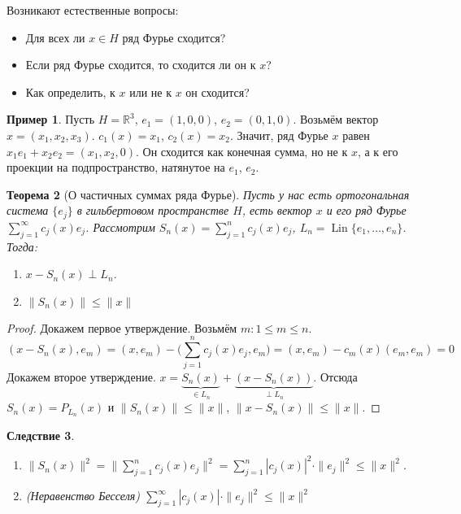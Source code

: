 \documentclass[11pt,openany,a4paper]{scrartcl}
\theoremstyle{plain}
\newtheorem{theorem}{Теорема}[subsection]
\newtheorem{corollary}[theorem]{Следствие}
\theoremstyle{definition}
\newtheorem{example}[theorem]{Пример}
\newcommand\mb{\mathbb}
\newcommand\real{\mb R}
\DeclareMathOperator{\Lin}{Lin}
\begin{document}
Возникают естественные вопросы:
\begin{itemize}
    \item Для всех ли $x \in H$ ряд Фурье сходится?
    \item Если ряд Фурье сходится, то сходится ли он к $x$?
    \item Как определить, к $x$ или не к $x$ он сходится?
\end{itemize}

\begin{example}\label{fourier_series_bad_example}
    Пусть $H = \real^3$, $e_1 = (1, 0, 0)$, $e_2 = (0, 1, 0)$. Возьмём вектор
$x = (x_1, x_2, x_3)$. $c_1(x) = x_1$, $c_2(x) = x_2$. Значит, ряд Фурье $x$ равен
$x_1e_1 + x_2e_2 = (x_1, x_2, 0)$. Он сходится как конечная сумма, но не к $x$, а
к его проекции на подпространство, натянутое на $e_1$, $e_2$.
\end{example}

\begin{theorem}[О частичных суммах ряда Фурье]
    Пусть у нас есть ортогональная система $\{e_j\}$ в гильбертовом пространстве
    $H$, есть вектор $x$ и его ряд Фурье $\sum\limits_{j=1}^\infty c_j(x)e_j$.
    Рассмотрим $S_n(x) = \sum\limits_{j=1}^n c_j(x)e_j$,
    $L_n = \Lin \{e_1,\ldots,e_n\}$. Тогда:
    \begin{enumerate}
        \item $x - S_n(x) \perp L_n$.
        \item $\|S_n(x)\| \leqslant \|x\|$
    \end{enumerate}
\end{theorem}
\begin{proof}
    Докажем первое утверждение. Возьмём $m: 1 \leqslant m \leqslant n$.
    $$
    (x - S_n(x), e_m) = (x, e_m) - \bigg(\sum\limits_{j=1}^n c_j(x)e_j, e_m\bigg) =
    (x, e_m) - c_m(x)(e_m, e_m) = 0
    $$
    Докажем второе утверждение. $x = \underbrace{S_n(x)}_{\in L_n} +
    \underbrace{(x - S_n(x))}_{\perp L_n}$. Отсюда $S_n(x) = P_{L_n}(x)$ и
    $\|S_n(x)\|\leqslant \|x\|$, $\|x - S_n(x)\| \leqslant \|x\|$.
\end{proof}
\begin{corollary}
\mbox{}
    \begin{enumerate}
        \item $\|S_n(x)\|^2 = \|\sum\limits_{j=1}^n c_j(x)e_j\|^2 =
        \sum\limits_{j=1}^n |c_j(x)|^2 \cdot \|e_j\|^2 \leqslant \|x\|^2$.
        \item (Неравенство Бесселя)
        $\sum\limits_{j=1}^\infty |c_j(x)|\cdot \|e_j\|^2 \leqslant \|x\|^2$
    \end{enumerate}
\end{corollary}
\end{document}
